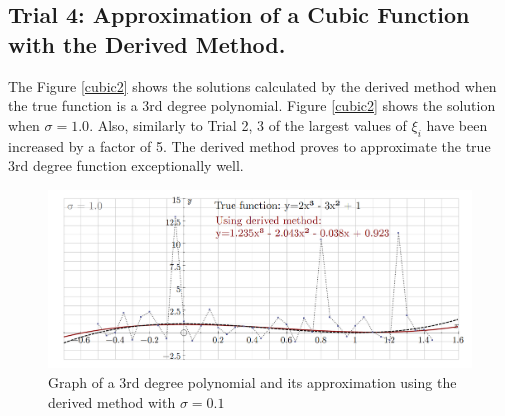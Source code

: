 \subsection{Trial 4: Approximation of a Cubic Function with the Derived Method.}
The Figure \vref{cubic2} shows the solutions calculated by the derived method when the true function is a 3rd degree polynomial. Figure \vref{cubic2} shows the solution when $\sigma=1.0$. Also, similarly to Trial 2, 3 of the largest values of $\xi_i$ have been increased by a  factor of 5. The derived method proves to approximate the true 3rd degree function exceptionally well.
 
\begin{figure}[H]
\caption{Graph of a 3rd degree polynomial and its approximation using the derived method with $\sigma=0.1$}
\label{cubic2}
\includegraphics[scale=0.35]{updated/cubic2}
\centering
\end{figure}

